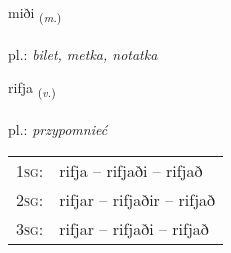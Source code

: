 \documentclass[frontgrid, backgrid]{flacards}\usepackage[]{graphicx}\usepackage[]{xcolor}
\begin{document}
\renewcommand{\blhead}{\vskip5pt {\small\bfseries\footnotesize Nafnorð | Noun }}
\renewcommand{\bcfoot}{\vskip5pt \hspace{2pt}{\small\bfseries\footnotesize 2K}}


{miði \small{\textsubscript{(\textit{m.})}} \\[1ex] %
\textphonetic{[mɪːðɪ]} \\
pl.: \emph{bilet, metka, notatka} \\  [2ex]
\renewcommand*{\arraystretch}{0.8}
}

\renewcommand{\flhead}{\vskip5pt \fboxsep=0pt {\small\bfseries\footnotesize Sagnorð | Verb}}
\renewcommand{\fcfoot}{\vskip5pt \fboxsep=0pt \hspace{2pt}{\small\bfseries\footnotesize 2K}}

\renewcommand{\blhead}{\vskip5pt {\small\bfseries\footnotesize Sagnorð | Verb }}
\renewcommand{\bcfoot}{\vskip5pt \hspace{2pt}{\small\bfseries\footnotesize 2K}}


{rifja \small{\textsubscript{(\textit{v.})}} \\[1ex] %
\textphonetic{[rɪvja]} \\
pl.: \emph{przypomnieć} \\  [2ex]
\renewcommand*{\arraystretch}{0.8}
\begin{tabular}{p{1cm}l}
\textsc{1sg}: & rifja -- rifjaði -- rifjað \\ 
\textsc{2sg}: & rifjar -- rifjaðir -- rifjað \\ 
\textsc{3sg}: & rifjar -- rifjaði -- rifjað \\ 
\end{tabular}
}

\renewcommand{\flhead}{\vskip5pt \fboxsep=0pt {\small\bfseries\footnotesize Nafnorð | Noun}}
\renewcommand{\fcfoot}{\vskip5pt \fboxsep=0pt \hspace{2pt}{\small\bfseries\footnotesize 2K}}
\end{document}
